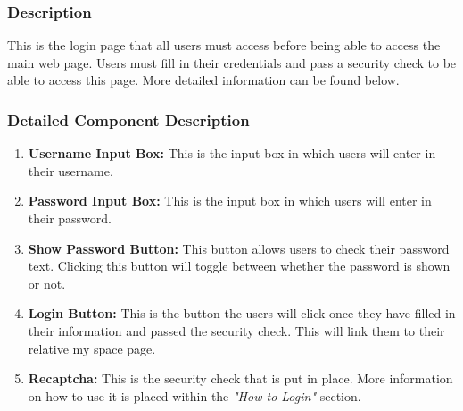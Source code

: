 \documentclass[14pt, a4paper]{article}
\begin{document}
\subsubsection{Description}
This is the login page that all users must access before being able to access the main web page. Users must fill in their credentials and pass a security check to be able to access this page. More detailed information can be found below.
\subsubsection{Detailed Component Description}
\begin{enumerate}
\item \textbf{Username Input Box:} This is the input box in which users will enter in their username.
\item \textbf{Password Input Box:} This is the input box in which users will enter in their password.
\item \textbf{Show Password Button:} This button allows users to check their password text. Clicking this button will toggle between whether the password is shown or not.
\item \textbf{Login Button:} This is the button the users will click once they have filled in their information and passed the security check. This will link them to their relative my space page.
\item \textbf{Recaptcha: } This is the security check that is put in place. More information on how to use it is placed within the \textit{"How to Login"} section.
\end{enumerate}
\end{document}
